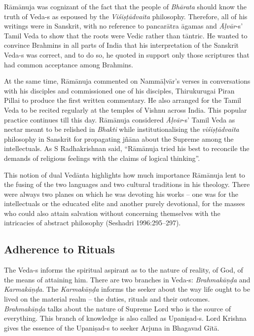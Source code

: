 Rāmānuja was cognizant of the fact that the people of \textit{Bhārata} should know the truth of Veda-s as espoused by the \textit{Viśiṣṭādvaita} philosophy. Therefore, all of his writings were in Sanskrit, with no reference to pancarātra āgamas and \textit{Āḷvār}-s’ Tamil Veda to show that the roots were Vedic rather than tāntric. He wanted to convince Brahmins in all parts of India that his interpretation of the Sanskrit Veda-s was correct, and to do so, he quoted in support only those scriptures that had common acceptance among Brahmins.

At the same time, Rāmānuja commented on Nammāḷvār’s verses in conversations with his disciples and commissioned one of his disciples, Thirukurugai Piran Pillai to produce the first written commentary. He also arranged for the Tamil Veda to be recited regularly at the temples of Vishnu across India. This popular practice continues till this day. Rāmānuja considered \textit{Āḷvār}-s’ Tamil Veda as nectar meant to be relished in\textit{ Bhakti} while institutionalising the \textit{viśiṣṭādvaita} philosophy in Sanskrit for propagating jñāna about the Supreme among the intellectuals. As S Radhakrishnan said, “Rāmānuja tried his best to reconcile the demands of religious feelings with the claims of logical thinking”.

This notion of dual Vedānta highlights how much importance Rāmānuja lent to the fusing of the two languages and two cultural traditions in his theology. There were always two planes on which he was devoting his works – one was for the intellectuals or the educated elite and another purely devotional, for the masses who could also attain salvation without concerning themselves with the intricacies of abstract philosophy (Seshadri 1996:295–297).


\subsection*{Adherence to Rituals}

The Veda-s informs the spiritual aspirant as to the nature of reality, of God, of the means of attaining him. There are two branches in Veda-s: \textit{Brahmakāņḍa} and \textit{Karmakāņḍa}. The \textit{Karmakāņḍa} informs the seeker about the way life ought to be lived on the material realm – the duties, rituals and their outcomes. \textit{Brahmakāņḍa} talks about the nature of Supreme Lord who is the source of everything. This branch of knowledge is also called as Upaniṣad-s. Lord Krishna gives the essence of the Upaniṣad-s to seeker Arjuna in Bhagavad Gītā.

